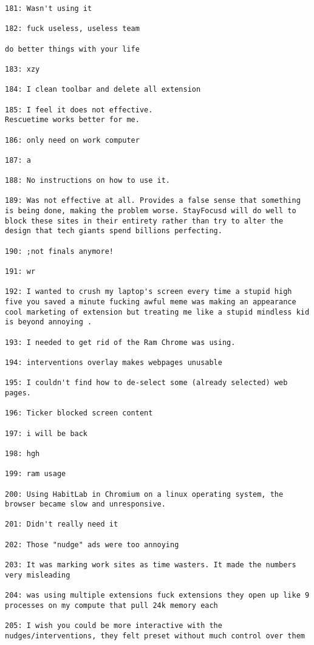 \begin{lstlisting}[breaklines]
181: Wasn't using it

182: fuck useless, useless team

do better things with your life

183: xzy

184: I clean toolbar and delete all extension

185: I feel it does not effective.
Rescuetime works better for me.

186: only need on work computer

187: a

188: No instructions on how to use it.

189: Was not effective at all. Provides a false sense that something is being done, making the problem worse. StayFocusd will do well to block these sites in their entirety rather than try to alter the design that tech giants spend billions perfecting.

190: ;not finals anymore!

191: wr

192: I wanted to crush my laptop's screen every time a stupid high five you saved a minute fucking awful meme was making an appearance cool marketing of extension but treating me like a stupid mindless kid is beyond annoying .

193: I needed to get rid of the Ram Chrome was using.

194: interventions overlay makes webpages unusable

195: I couldn't find how to de-select some (already selected) web pages.

196: Ticker blocked screen content

197: i will be back

198: hgh

199: ram usage

200: Using HabitLab in Chromium on a linux operating system, the browser became slow and unresponsive.

201: Didn't really need it

202: Those "nudge" ads were too annoying

203: It was marking work sites as time wasters. It made the numbers very misleading

204: was using multiple extensions fuck extensions they open up like 9 processes on my compute that pull 24k memory each

205: I wish you could be more interactive with the nudges/interventions, they felt preset without much control over them


\end{lstlisting}
